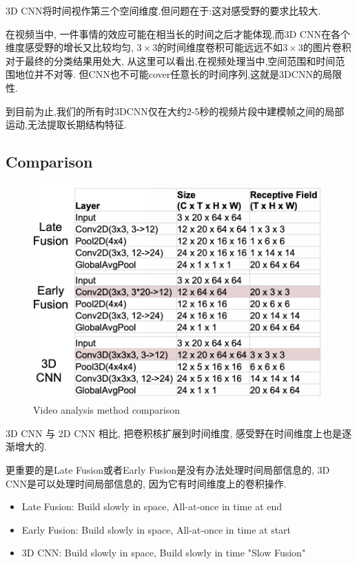 3D CNN将时间视作第三个空间维度.但问题在于:这对感受野的要求比较大.

在视频当中,
一件事情的效应可能在相当长的时间之后才能体现,而3D CNN在各个维度感受野的增长又比较均匀,
$3\times3$的时间维度卷积可能远远不如$3\times3$的图片卷积对于最终的分类结果用处大,
从这里可以看出,在视频处理当中,空间范围和时间范围地位并不对等.
但CNN也不可能cover任意长的时间序列,这就是3DCNN的局限性.

到目前为止,我们的所有时3DCNN仅在大约2-5秒的视频片段中建模帧之间的局部运动,无法提取长期结构特征.

\subsection{Comparison}

\begin{figure}[htbp]
    \centering
    \includegraphics[scale=0.35]{figures/video_cmp.png}
    \caption{Video analysis method comparison}
\end{figure}

3D CNN 与 2D CNN 相比, 把卷积核扩展到时间维度, 感受野在时间维度上也是逐渐增大的.

更重要的是Late Fusion或者Early Fusion是没有办法处理时间局部信息的, 
3D CNN是可以处理时间局部信息的, 因为它有时间维度上的卷积操作.

\begin{itemize}
    \item Late Fusion: Build slowly in space, All-at-once in time at end
    \item Early Fusion: Build slowly in space, All-at-once in time at start
    \item 3D CNN: Build slowly in space, Build slowly in time "Slow Fusion"
\end{itemize}

